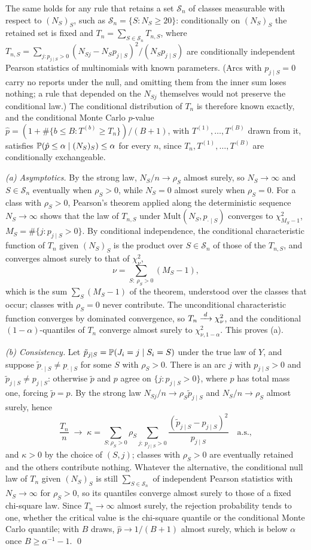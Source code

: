 The same holds for any rule that retains a set $\mathcal S_n$ of classes measurable with respect to $(N_S)_S$, such as $\mathcal S_n=\{S:N_S\ge20\}$: conditionally on $(N_S)_S$ the retained set is fixed and $T_n=\sum_{S\in\mathcal S_n}T_{n,S}$, where $T_{n,S}=\sum_{j:p_{j\mid S}>0}(N_{Sj}-N_Sp_{j\mid S})^2/(N_Sp_{j\mid S})$ are conditionally independent Pearson statistics of multinomials with known parameters. (Arcs with $p_{j\mid S}=0$ carry no reports under the null, and omitting them from the inner sum loses nothing; a rule that depended on the $N_{Sj}$ themselves would not preserve the conditional law.) The conditional distribution of $T_n$ is therefore known exactly, and the conditional Monte Carlo $p$-value $\hat p=(1+\#\{b\le B:T^{(b)}\ge T_n\})/(B+1)$, with $T^{(1)},\dots,T^{(B)}$ drawn from it, satisfies $\mathbb{P}(\hat p\le\alpha\mid(N_S)_S)\le\alpha$ for every $n$, since $T_n,T^{(1)},\dots,T^{(B)}$ are conditionally exchangeable.

\emph{(a) Asymptotics.} By the strong law, $N_S/n\to\rho_S$ almost surely, so $N_S\to\infty$ and $S\in\mathcal S_n$ eventually when $\rho_S>0$, while $N_S=0$ almost surely when $\rho_S=0$. For a class with $\rho_S>0$, Pearson's theorem applied along the deterministic sequence $N_S\to\infty$ shows that the law of $T_{n,S}$ under $\mathrm{Mult}(N_S,p_{\cdot\mid S})$ converges to $\chi^2_{M_S-1}$, $M_S=\#\{j:p_{j\mid S}>0\}$. By conditional independence, the conditional characteristic function of $T_n$ given $(N_S)_S$ is the product over $S\in\mathcal S_n$ of those of the $T_{n,S}$, and converges almost surely to that of $\chi^2_\nu$,
\[
\nu=\sum_{S:\ \rho_S>0}(M_S-1),
\]
which is the sum $\sum_S(M_S-1)$ of the theorem, understood over the classes that occur; classes with $\rho_S=0$ never contribute. The unconditional characteristic function converges by dominated convergence, so $T_n\xrightarrow{\;d\;}\chi^2_\nu$, and the conditional $(1-\alpha)$-quantiles of $T_n$ converge almost surely to $\chi^2_{\nu,1-\alpha}$. This proves (a).

\emph{(b) Consistency.} Let $\tilde p_{j\mid S}=\mathbb{P}(J_i=j\mid S_i=S)$ under the true law of $Y$, and suppose $\tilde p_{\cdot\mid S}\ne p_{\cdot\mid S}$ for some $S$ with $\rho_S>0$. There is an arc $j$ with $p_{j\mid S}>0$ and $\tilde p_{j\mid S}\ne p_{j\mid S}$: otherwise $\tilde p$ and $p$ agree on $\{j:p_{j\mid S}>0\}$, where $p$ has total mass one, forcing $\tilde p=p$. By the strong law $N_{Sj}/n\to\rho_S\tilde p_{j\mid S}$ and $N_S/n\to\rho_S$ almost surely, hence
\[
\frac{T_n}{n}\;\to\;\kappa=\sum_{S:\rho_S>0}\rho_S\sum_{j:\ p_{j\mid S}>0}\frac{(\tilde p_{j\mid S}-p_{j\mid S})^2}{p_{j\mid S}}\quad\text{a.s.},
\]
and $\kappa>0$ by the choice of $(S,j)$; classes with $\rho_S>0$ are eventually retained and the others contribute nothing. Whatever the alternative, the conditional null law of $T_n$ given $(N_S)_S$ is still $\sum_{S\in\mathcal S_n}$ of independent Pearson statistics with $N_S\to\infty$ for $\rho_S>0$, so its quantiles converge almost surely to those of a fixed chi-square law. Since $T_n\to\infty$ almost surely, the rejection probability tends to one, whether the critical value is the chi-square quantile or the conditional Monte Carlo quantile; with $B$ draws, $\hat p\to1/(B+1)$ almost surely, which is below $\alpha$ once $B\ge\alpha^{-1}-1$. \qed

